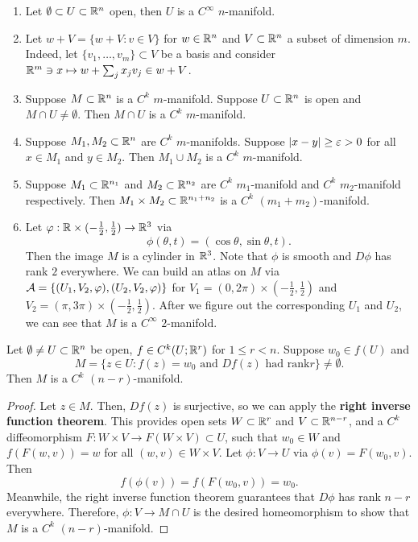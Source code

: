 \documentclass[a4paper]{article}
\begin{document}
\begin{eg}
\begin{enumerate}
\item Let $\emptyset \subset U \subset \mathbb{R}^n$ open, then
$U$ is a $C^\infty$ $n$-manifold.

\item Let $w + V = \{w + V : v \in V\}$ for $w \in \mathbb{R}^n$
and $V \subset \mathbb{R}^n$ a subset of dimension $m$. Indeed,
let $\{v_1, \dots, v_m\} \subset V$ be a basis and consider
$\mathbb{R}^m \ni x \mapsto w + \sum_j x_j v_j \in w + V$.

\item Suppose $M \subset \mathbb{R}^n$ is a $C^k$ $m$-manifold.
Suppose $U \subset \mathbb{R}^n$ is open and $M \cap U \neq
\emptyset$. Then $M \cap U$ is a $C^k$ $m$-manifold.

\item Suppose $M_1, M_2 \subset \mathbb{R}^n$ are $C^k$
$m$-manifolds. Suppose $\left\lvert x - y\right\rvert \geq \varepsilon > 0$ for all
$x \in M_1$ and $y \in M_2$. Then $M_1 \cup M_2$ is a
$C^k$ $m$-manifold.

\item Suppose $M_1 \subset \mathbb{R}^{n_1}$ and $M_2 \subset \mathbb{R}^{n_2}$
are $C^k$ $m_1$-manifold and $C^k$ $m_2$-manifold respectively.
Then $M_1 \times M_2 \subset \mathbb{R}^{n_1 + n_2}$ is a
$C^k$ $(m_1 + m_2)$-manifold.

\item Let $\varphi: \mathbb{R} \times (-\frac{1}{2}, \frac{1}{2})
\to \mathbb{R}^3$ via
\[
\phi(\theta, t) = (\cos \theta, \sin \theta, t).
\]
Then the image $M$ is a cylinder in $\mathbb{R}^3$. Note that $\phi$
is smooth and $D \phi$ has rank $2$ everywhere. We can build
an atlas on $M$ via $\mathcal{A} = \{(U_1, V_2, \varphi), (U_2, V_2, \varphi)\}$
for $V_1 = (0, 2\pi) \times (-\frac{1}{2}, \frac{1}{2})$ and
$V_2 = (\pi, 3\pi) \times (-\frac{1}{2}, \frac{1}{2})$.
After we figure out the corresponding $U_1$ and $U_2$,
we can see that $M$ is a $C^\infty$ $2$-manifold.
\end{enumerate}
\end{eg}

\begin{thm}
Let $\emptyset \neq U \subset \mathbb{R}^n$ be open, $f \in C^k(U;
\mathbb{R}^r)$ for $1 \leq r < n$. Suppose $w_0 \in f(U)$ and
\[
M = \{z \in U : f(z) = w_0 \text{ and } Df(z) \text{ had rank
$r$}\} \neq \emptyset.
\]
Then $M$ is a $C^k$ $(n-r)$-manifold.
\end{thm}

\begin{proof}
Let $z \in M$. Then, $Df(z)$ is surjective, so we can apply
the \textbf{right inverse function theorem}.  This provides
open sets $W \subset \mathbb{R}^r$ and $V \subset \mathbb{R}^{n-r}$, and
a $C^k$ diffeomorphism
$F : W \times V \to F(W \times V) \subset U$, such that
$w_0 \in W$ and $f(F(w, v)) = w$ 
for all $(w, v) \in W \times V$. Let $\phi: V \to U$ via
$\phi(v) = F(w_0, v)$. Then
\[
f(\phi(v)) = f(F(w_0, v)) = w_0.
\]
Meanwhile, the right inverse function theorem
guarantees that $D \phi$ has rank $n - r$ everywhere.
Therefore, $\phi: V \to M \cap U$ is the desired
homeomorphism to show that $M$ is a $C^k$ $(n-r)$-manifold.
\end{proof}
\end{document}
